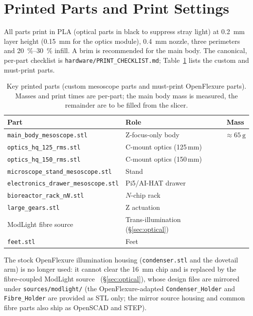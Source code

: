 \section{Printed Parts and Print Settings}
\label{sec:appendix}

All parts print in PLA (optical parts in black to suppress stray light) at
\SI{0.2}{\milli\meter} layer height (\SI{0.15}{\milli\meter} for the optics
module), \SI{0.4}{\milli\meter} nozzle, three perimeters and
\SIrange{20}{30}{\percent} infill. A brim is recommended for the main body. The
canonical, per-part checklist is \texttt{hardware/PRINT\_CHECKLIST.md};
Table~\ref{tab:printed} lists the custom and must-print parts.

\begin{table}[!t]
  \centering
  \caption{Key printed parts (custom mesoscope parts and must-print OpenFlexure
  parts). Masses and print times are per-part; the main body mass is measured,
  the remainder are to be filled from the slicer.}
  \label{tab:printed}
  \begin{tabular}{@{}llc@{}}
    \toprule
    Part & Role & Mass \\
    \midrule
    \texttt{main\_body\_mesoscope.stl}        & Z-focus-only body & $\approx\SI{65}{\gram}$ \\
    \texttt{optics\_hq\_125\_rms.stl}         & C-mount optics (125\,mm) & \todo{} \\
    \texttt{optics\_hq\_150\_rms.stl}         & C-mount optics (150\,mm) & \todo{} \\
    \texttt{microscope\_stand\_mesoscope.stl} & Stand & \todo{} \\
    \texttt{electronics\_drawer\_mesoscope.stl} & Pi5/AI-HAT drawer & \todo{} \\
    \texttt{bioreactor\_rack\_n\textit{N}.stl} & $N$-chip rack & \todo{} \\
    \texttt{large\_gears.stl}                 & Z actuation & \todo{} \\
    ModLight fibre source                     & Trans-illumination (\S\ref{sec:optical}) & \todo{} \\
    \texttt{feet.stl}                         & Feet & \todo{} \\
    \bottomrule
  \end{tabular}
\end{table}

The stock OpenFlexure illumination housing (\texttt{condenser.stl} and the
dovetail arm) is no longer used: it cannot clear the \SI{16}{\milli\meter} chip
and is replaced by the fibre-coupled ModLight source~\cite{Gibson2023}
(\S\ref{sec:optical}), whose design files are mirrored under
\texttt{sources/modlight/} (the OpenFlexure-adapted \texttt{Condenser\_Holder}
and \texttt{Fibre\_Holder} are provided as STL only; the mirror source housing
and common fibre parts also ship as OpenSCAD and STEP).

